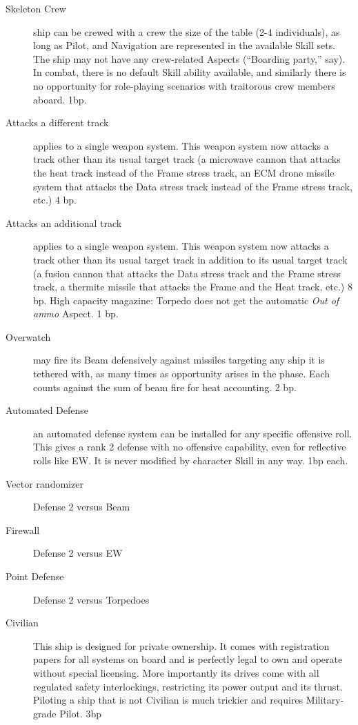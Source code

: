 \begin{description}
\item[Skeleton Crew]
ship can be crewed with a crew the size of the table (2-4 individuals), as
long as Pilot, and Navigation are represented in the available Skill sets. The
ship may not have any crew-related Aspects (``Boarding party,'' say). In combat,
there is no default Skill ability available, and similarly there is no
opportunity for role-playing scenarios with traitorous crew members aboard.
1bp.
\item[Attacks a different track]
applies to a single weapon system. This weapon system now attacks a track
other than its usual target track (a microwave cannon that attacks the heat
track instead of the Frame stress track, an ECM drone missile system that
attacks the Data stress track instead of the Frame stress track, etc.) 4 bp.
\item[Attacks an additional track]
applies to a single weapon system. This weapon system now attacks a track
other than its usual target track in addition to its usual target track (a
fusion cannon that attacks the Data stress track and the Frame stress track, a
thermite missile that attacks the Frame and the Heat track, etc.) 8 bp.  High
capacity magazine: Torpedo does not get the automatic \emph{Out of ammo} Aspect. 1
bp.
\item[Overwatch]
may fire its Beam defensively against missiles targeting any ship it is
tethered with, as many times as opportunity arises in the phase. Each counts
against the sum of beam fire for heat accounting. 2 bp.
\item[Automated Defense]
an automated defense system can be installed for any specific offensive roll.
This gives a rank 2 defense with no offensive capability, even for reflective
rolls like EW. It is never modified by character Skill in any way. 1bp each.
\item[Vector randomizer]
Defense 2 versus Beam
\item[Firewall]
Defense 2 versus EW
\item[Point Defense]
Defense 2 versus Torpedoes
\item[Civilian]
This ship is designed for private ownership. It comes with registration papers
for all systems on board and is perfectly legal to own and operate without
special licensing. More importantly its drives come with all regulated safety
interlockings, restricting its power output and its thrust. Piloting a ship
that is not Civilian is much trickier and requires Military-grade Pilot. 3bp

\end{description}
